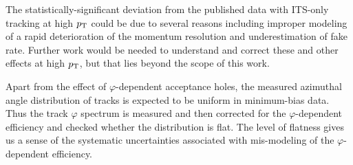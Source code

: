 The statistically-significant deviation from the published data with ITS-only tracking at high $p_{\mathrm{T}}$ could be due to several reasons  including improper modeling of a rapid deterioration of the momentum resolution and underestimation of fake rate. Further work would be needed to understand and correct these and other effects at high $p_{\mathrm{T}}$, but that lies beyond the scope of this work. 



Apart from the effect of $\varphi$-dependent acceptance holes, the measured azimuthal angle distribution of tracks is expected to be uniform in minimum-bias data. Thus the track $\varphi$ spectrum is measured and then corrected for the $\varphi$-dependent efficiency and checked whether the distribution is flat. The level of flatness gives us a sense of the systematic uncertainties associated with mis-modeling of the $\varphi$-dependent efficiency.




